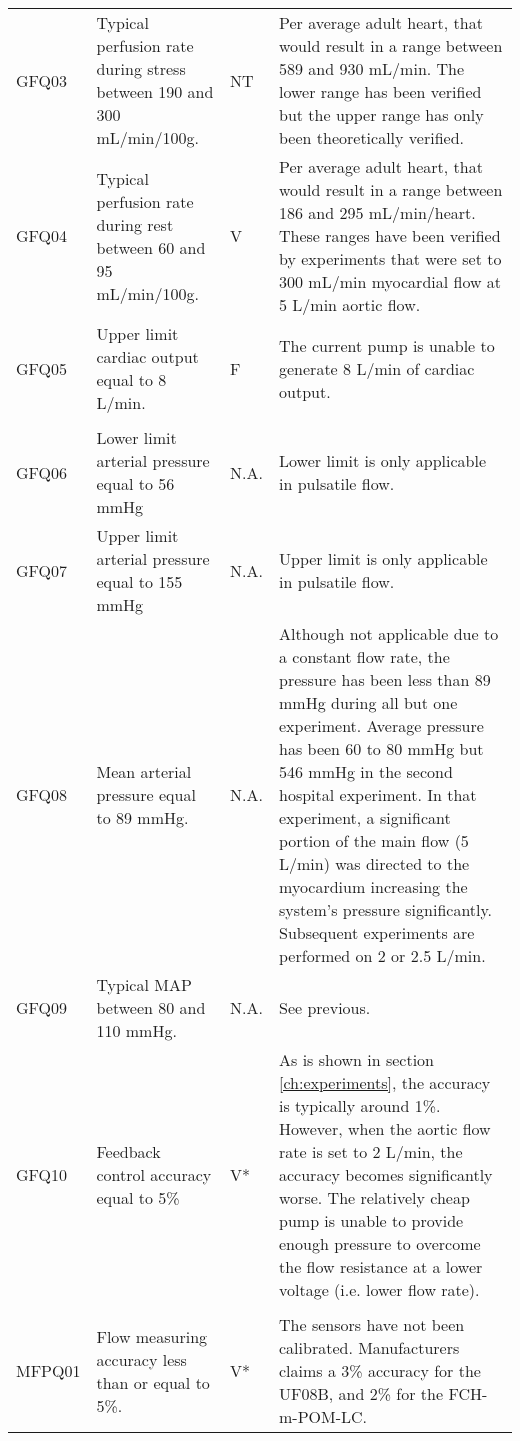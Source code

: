 \begin{longtable}{m{1.5cm}|m{5.25cm}>{\centering\arraybackslash}m{1cm}m{5.75cm}|}
		GFQ03	& Typical perfusion rate during stress between 190 and 300 mL/min/100g. & \cellcolor{blue!50}NT & Per average adult heart, that would result in a range between 589 and 930 mL/min. The lower range has been verified but the upper range has only been theoretically verified. \\
		GFQ04	& Typical perfusion rate during rest between 60 and 95 mL/min/100g. & \cellcolor{green!50}V & Per average adult heart, that would result in a range between 186 and 295 mL/min/heart. These ranges have been verified by experiments that were set to 300 mL/min myocardial flow at 5 L/min aortic flow. \\
		GFQ05 & Upper limit cardiac output equal to 8 L/min. & \cellcolor{red!50}F & The current pump is unable to generate 8 L/min of cardiac output. \\ 
												& & & \\
			GFQ06 & Lower limit arterial pressure equal to 56 mmHg & \cellcolor{blue!50}N.A. & Lower limit is only applicable in pulsatile flow. \\
			GFQ07& Upper limit arterial pressure equal to 155 mmHg & \cellcolor{blue!50}N.A. &  Upper limit is only applicable in pulsatile flow.\\
			GFQ08 & Mean arterial pressure equal to 89 mmHg. & \cellcolor{green!50}N.A. & Although not applicable due to a constant flow rate, the pressure has been less than 89 mmHg during all but one experiment. Average pressure has been 60 to 80 mmHg but 546 mmHg in the second hospital experiment. In that experiment, a significant portion of the main flow (5 L/min) was directed to the myocardium increasing the system's pressure significantly. Subsequent experiments are performed on 2 or 2.5 L/min. \\
			GFQ09 & Typical MAP between 80 and 110 mmHg. & \cellcolor{green!50}N.A. & See previous. \\
		GFQ10	& Feedback control accuracy equal to 5\% & \cellcolor{yellow!50}V* & As is shown in section \ref{ch:experiments}, the accuracy is typically around 1\%. However, when the aortic flow rate is set to 2 L/min, the accuracy becomes significantly worse. The relatively cheap pump is unable to provide enough pressure to overcome the flow resistance at a lower voltage (i.e. lower flow rate). \\
					& & & \\
		MFPQ01	& Flow measuring accuracy less than or equal to 5\%. & \cellcolor{yellow!50}V* & The sensors have not been calibrated. Manufacturers claims a 3\% accuracy for the UF08B, and 2\% for the FCH-m-POM-LC. \\

\end{longtable}
